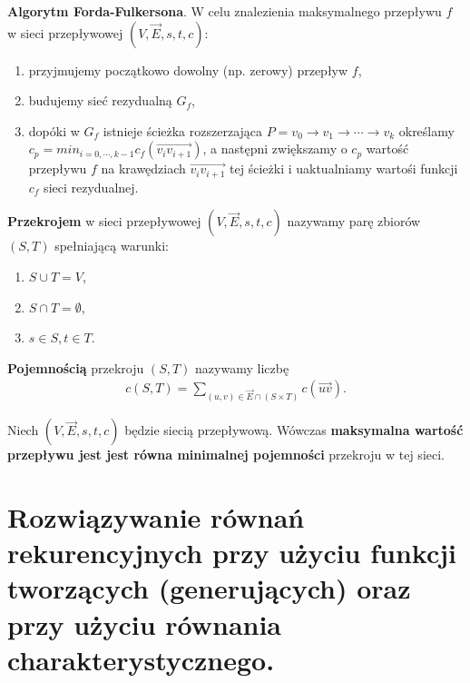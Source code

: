 \documentclass[12pt]{article}
\begin{document}
    \begin{theorem}
        \textbf{Algorytm Forda-Fulkersona}. W celu znalezienia maksymalnego przepływu $f$ w sieci przepływowej
        $(V, \vec{E}, s, t, c)$:
        \begin{enumerate}
            \item przyjmujemy początkowo dowolny (np. zerowy) przepływ $f$,
            \item budujemy sieć rezydualną $G_f$,
            \item dopóki w $G_f$ istnieje ścieżka rozszerzająca $P = v_0 \rightarrow v_1 \rightarrow \cdots \rightarrow v_k$
            określamy $c_p = min_{i = 0, \cdots, k-1} c_f(\vec{v_i v_{i+1}})$, a następni zwiększamy o $c_p$ wartość
            przepływu $f$ na krawędziach $\vec{v_i v_{i+1}}$ tej ścieżki i uaktualniamy wartośi funkcji $c_f$ sieci
            rezydualnej.
        \end{enumerate}
    \end{theorem}

    \begin{definition}
        \textbf{Przekrojem} w sieci przepływowej $(V, \vec{E}, s, t, c)$ nazywamy parę zbiorów $(S, T)$ spełniającą
        warunki:
        \begin{enumerate}
            \item $S \cup T = V$,
            \item $S \cap T = \emptyset$,
            \item $s \in S, t \in T$.
        \end{enumerate}

        \textbf{Pojemnością} przekroju $(S,T)$ nazywamy liczbę
        \begin{align*}
            c(S, T) = \sum_{(u,v) \in \vec{E} \cap (S \times T)} c(\vec{uv}).
        \end{align*}
    \end{definition}

    \begin{theorem}
        Niech $(V, \vec{E}, s, t, c)$ będzie siecią przepływową. Wówczas \textbf{maksymalna wartość przepływu jest
        jest równa minimalnej pojemności} przekroju w tej sieci.
    \end{theorem}

    \newpage

    \section{Rozwiązywanie równań rekurencyjnych przy użyciu funkcji tworzących (generujących) oraz przy użyciu
    równania charakterystycznego.}
\end{document}
